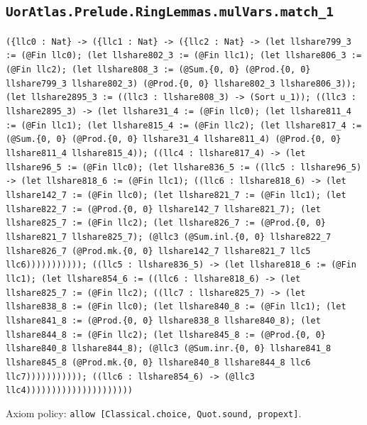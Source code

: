 \documentclass[11pt]{article}
\begin{document}
\subsection*{\texttt{UorAtlas.Prelude.RingLemmas.mulVars.match\_1}}
\noindent\texttt{(\{llc0 : Nat\} -> (\{llc1 : Nat\} -> (\{llc2 : Nat\} -> (let llshare799\_3 := (@Fin llc0); (let llshare802\_3 := (@Fin llc1); (let llshare806\_3 := (@Fin llc2); (let llshare808\_3 := (@Sum.\{0, 0\} (@Prod.\{0, 0\} llshare799\_3 llshare802\_3) (@Prod.\{0, 0\} llshare802\_3 llshare806\_3)); (let llshare2895\_3 := ((llc3 : llshare808\_3) -> (Sort u\_1)); ((llc3 : llshare2895\_3) -> (let llshare31\_4 := (@Fin llc0); (let llshare811\_4 := (@Fin llc1); (let llshare815\_4 := (@Fin llc2); (let llshare817\_4 := (@Sum.\{0, 0\} (@Prod.\{0, 0\} llshare31\_4 llshare811\_4) (@Prod.\{0, 0\} llshare811\_4 llshare815\_4)); ((llc4 : llshare817\_4) -> (let llshare96\_5 := (@Fin llc0); (let llshare836\_5 := ((llc5 : llshare96\_5) -> (let llshare818\_6 := (@Fin llc1); ((llc6 : llshare818\_6) -> (let llshare142\_7 := (@Fin llc0); (let llshare821\_7 := (@Fin llc1); (let llshare822\_7 := (@Prod.\{0, 0\} llshare142\_7 llshare821\_7); (let llshare825\_7 := (@Fin llc2); (let llshare826\_7 := (@Prod.\{0, 0\} llshare821\_7 llshare825\_7); (@llc3 (@Sum.inl.\{0, 0\} llshare822\_7 llshare826\_7 (@Prod.mk.\{0, 0\} llshare142\_7 llshare821\_7 llc5 llc6))))))))))); ((llc5 : llshare836\_5) -> (let llshare818\_6 := (@Fin llc1); (let llshare854\_6 := ((llc6 : llshare818\_6) -> (let llshare825\_7 := (@Fin llc2); ((llc7 : llshare825\_7) -> (let llshare838\_8 := (@Fin llc0); (let llshare840\_8 := (@Fin llc1); (let llshare841\_8 := (@Prod.\{0, 0\} llshare838\_8 llshare840\_8); (let llshare844\_8 := (@Fin llc2); (let llshare845\_8 := (@Prod.\{0, 0\} llshare840\_8 llshare844\_8); (@llc3 (@Sum.inr.\{0, 0\} llshare841\_8 llshare845\_8 (@Prod.mk.\{0, 0\} llshare840\_8 llshare844\_8 llc6 llc7))))))))))); ((llc6 : llshare854\_6) -> (@llc3 llc4)))))))))))))))))))))}\par
\noindent Axiom policy: \texttt{allow [Classical.choice, Quot.sound, propext]}.\par
\end{document}
